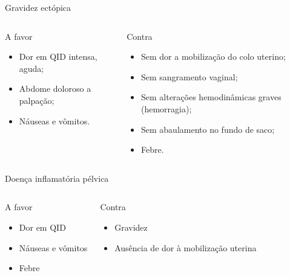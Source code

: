 \begin{frame}{Gravidez ectópica}
    \begin{columns}
        \begin{block}{A favor}
            \begin{itemize}
            \item Dor em QID intensa, aguda;
            \item Abdome doloroso a palpação;
            \item Náuseas e vômitos.
            \end{itemize}
        \end{block}
     
        \begin{block}{Contra}
            \begin{itemize}
             \item Sem dor a mobilização do colo uterino;
            \item Sem sangramento vaginal;
            \item Sem alterações hemodinâmicas graves (hemorragia);
            \item Sem abaulamento no fundo de saco;
            \item Febre.
            \end{itemize}
        \end{block}
    \end{columns}
\end{frame}

\begin{frame}{Doença inflamatória pélvica}
            \begin{columns}
                \begin{block}{A favor}
                    \begin{itemize}
                    \item Dor em QID
                    \item Náuseas e vômitos
                    \item Febre
                    \end{itemize}
                \end{block}
     
        \begin{block}{Contra}
            \begin{itemize}
                \item Gravidez\cite{abdou_postpartum_2017}
                \item Ausência de dor à mobilização uterina
            \end{itemize}
        \end{block}
    \end{columns}
\end{frame}

